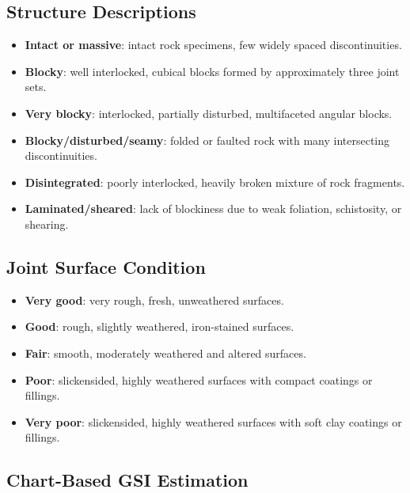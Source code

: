 \documentclass[a4paper,12pt]{article}
\begin{document}
\subsection{Structure Descriptions}

\begin{itemize}
    \item \textbf{Intact or massive}: intact rock specimens, few widely spaced discontinuities.
    \item \textbf{Blocky}: well interlocked, cubical blocks formed by approximately three joint sets.
    \item \textbf{Very blocky}: interlocked, partially disturbed, multifaceted angular blocks.
    \item \textbf{Blocky/disturbed/seamy}: folded or faulted rock with many intersecting discontinuities.
    \item \textbf{Disintegrated}: poorly interlocked, heavily broken mixture of rock fragments.
    \item \textbf{Laminated/sheared}: lack of blockiness due to weak foliation, schistosity, or shearing.
\end{itemize}

\subsection{Joint Surface Condition}

\begin{itemize}
    \item \textbf{Very good}: very rough, fresh, unweathered surfaces.
    \item \textbf{Good}: rough, slightly weathered, iron-stained surfaces.
    \item \textbf{Fair}: smooth, moderately weathered and altered surfaces.
    \item \textbf{Poor}: slickensided, highly weathered surfaces with compact coatings or fillings.
    \item \textbf{Very poor}: slickensided, highly weathered surfaces with soft clay coatings or fillings.
\end{itemize}

\subsection{Chart-Based GSI Estimation}
\end{document}
